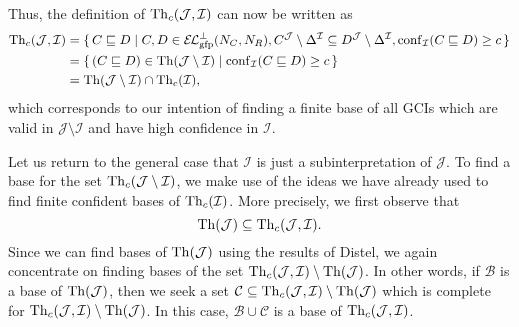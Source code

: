 Thus, the definition of $\operatorname{Th}_{c}(\mathcal{J}, \mathcal{I})$ can now be written as
\begin{align*}
  \operatorname{Th}_{c}(\mathcal{J}, \mathcal{I})
  &= \{\, C \sqsubseteq D \mid C, D \in {\ensuremath{{\mathcal{E}\kern-.3ex\mathcal{L}}_\text{gfp}^\bot}}(N_{C}, N_{R}),
  C^{\mathcal{J}} \setminus \Delta^{\mathcal{I}} \subseteq D^{\mathcal{J}}
  \setminus \Delta^{\mathcal{I}}, \operatorname{conf}_{\mathcal{I}}( C \sqsubseteq D ) \ge c \,\} \\
  &= {\{\, (C \sqsubseteq D) \in \operatorname{Th}(\mathcal{J} \setminus \mathcal{I}) \mid
    \operatorname{conf}_{\mathcal{I}} (C \sqsubseteq D) \ge c \,\}} \\
  &= \operatorname{Th}(\mathcal{J} \setminus \mathcal{I}) \cap \operatorname{Th}_{c}(\mathcal{I}),
\end{align*}
which corresponds to our intention of finding a finite base of all GCIs which are valid in
$\mathcal{J} \setminus \mathcal{I}$ and have high confidence in $\mathcal{I}$.

Let us return to the general case that $\mathcal{I}$ is just a subinterpretation of
$\mathcal{J}$.  To find a base for the set $\operatorname{Th}_{c}(\mathcal{J} \setminus \mathcal{I})$,
we make use of the ideas we have already used to find finite confident bases of
$\operatorname{Th}_{c}(\mathcal{I})$.  More precisely, we first observe that
\begin{equation*}
  \operatorname{Th}(\mathcal{J}) \subseteq \operatorname{Th}_{c}(\mathcal{J}, \mathcal{I}).
\end{equation*}
Since we can find bases of $\operatorname{Th}(\mathcal{J})$ using the results of Distel, we again
concentrate on finding bases of the set $\operatorname{Th}_{c}(\mathcal{J}, \mathcal{I}) \setminus
\operatorname{Th}(\mathcal{J})$.  In other words, if $\mathcal{B}$ is a base of $\operatorname{Th}(\mathcal{J})$, then
we seek a set $\mathcal{C} \subseteq \operatorname{Th}_{c}(\mathcal{J}, \mathcal{I}) \setminus
\operatorname{Th}(\mathcal{J})$ which is complete for $\operatorname{Th}_{c}(\mathcal{J}, \mathcal{I}) \setminus
\operatorname{Th}(\mathcal{J})$.  In this case, $\mathcal{B} \cup \mathcal{C}$ is a base of
$\operatorname{Th}_{c}(\mathcal{J}, \mathcal{I})$.

